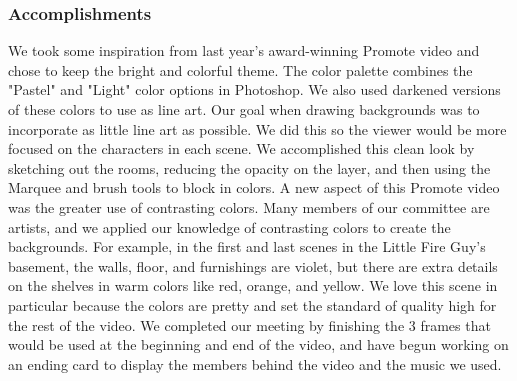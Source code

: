 \subsubsection*{Accomplishments}We took some inspiration from last year's award-winning Promote video and chose to keep the bright and colorful theme. The color palette combines the "Pastel" and "Light" color options in Photoshop. We also used darkened versions of these colors to use as line art. Our goal when drawing backgrounds was to incorporate as little line art as possible. We did this so the viewer would be more focused on the characters in each scene. We accomplished this clean look by sketching out the rooms, reducing the opacity on the layer, and then using the Marquee and brush tools to block in colors. A new aspect of this Promote video was the greater use of contrasting colors. Many members of our committee are artists, and we applied our knowledge of contrasting colors to create the backgrounds. For example, in the first and last scenes in the Little Fire Guy's basement, the walls, floor, and furnishings are violet, but there are extra details on the shelves in warm colors like red, orange, and yellow. We love this scene in particular because the colors are pretty and set the standard of quality high for the rest of the video. We completed our meeting by finishing the 3 frames that would be used at the beginning and end of the video, and have begun working on an ending card to display the members behind the video and the music we used.

